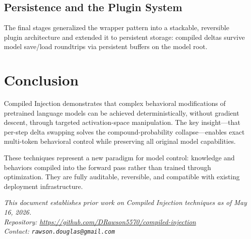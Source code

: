 \documentclass[11pt,a4paper]{article}
\begin{document}
\subsection{Persistence and the Plugin System}

The final stages generalized the wrapper pattern into a stackable, reversible plugin architecture and extended it to persistent storage: compiled deltas survive model save/load roundtrips via persistent buffers on the model root.

\section{Conclusion}

Compiled Injection demonstrates that complex behavioral modifications of pretrained language models can be achieved deterministically, without gradient descent, through targeted activation-space manipulation. The key insight---that per-step delta swapping solves the compound-probability collapse---enables exact multi-token behavioral control while preserving all original model capabilities.

These techniques represent a new paradigm for model control: knowledge and behaviors compiled into the forward pass rather than trained through optimization. They are fully auditable, reversible, and compatible with existing deployment infrastructure.

\vspace{1em}
\noindent\textit{This document establishes prior work on Compiled Injection techniques as of May 16, 2026.}\\
\textit{Repository: \url{https://github.com/DRawson5570/compiled-injection}}\\
\textit{Contact: \texttt{rawson.douglas@gmail.com}}
\end{document}
